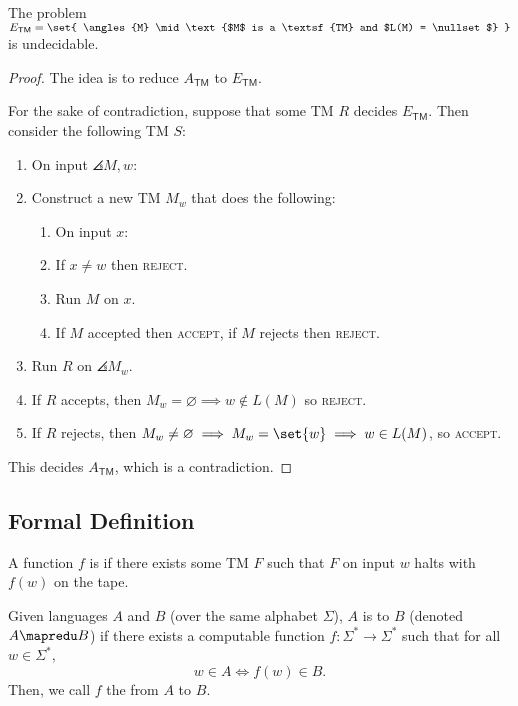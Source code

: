 \documentclass{standalone}
\begin{document}
\begin{proposition}
	The problem \(E_{\textsf{TM}} = \set{
		\angles{M} \mid \text{$M$ is a \textsf{TM} and $L(M) = \nullset$}
	}\) is undecidable.
\end{proposition}
\begin{proof}
	The idea is to reduce \(A_{\textsf{TM}}\) to \(E_{\textsf{TM}}\).

	For the sake of contradiction, suppose that some \textsf{TM} \(R\) decides \(E_{\textsf{TM}}\). Then consider the following \textsf{TM} \(S\):
	\begin{enumerate}[start=0]
		\item On input \(\angles{M, w}\):
		\item Construct a new \textsf{TM} \(M_w\) that does the following:
		\begin{enumerate}[(1), nosep, start=0]
			\item On input \(x\):
			\item If \(x \neq w\) then \textsc{reject}.
			\item Run \(M\) on \(x\).
			\item If \(M\) accepted then \textsc{accept}, if \(M\) rejects then \textsc{reject}.
		\end{enumerate}
		\item Run \(R\) on \(\angles{M_w}\).
		\item If \(R\) accepts, then \(M_w = \varnothing \implies w \notin L(M)\) so \textsc{reject}.
		\item If \(R\) rejects, then \(M_w \neq \varnothing \implies M_w = \set{w} \implies w \in L(M)\), so \textsc{accept}.
	\end{enumerate}
	This decides \(A_{\textsf{TM}}\), which is a contradiction.
\end{proof}

\subsection{Formal Definition}
\begin{definition}
	A function \(f\) is  if there exists some \textsf{TM} \(F\) such that \(F\) on input \(w\) halts with \(f(w)\) on the tape.
\end{definition}

\begin{definition}
	Given languages \(A\) and \(B\) (over the same alphabet \(\Sigma\)), \(A\) is  to \(B\) (denoted \(A \mapredu B\)) if there exists a computable function \(f\colon \Sigma^* \to \Sigma^*\) such that for all \(w \in \Sigma^*\),
	\[
		w \in A \iff f(w) \in B.
	\]
	Then, we call \(f\) the  from \(A\) to \(B\).
\end{definition}
\end{document}

